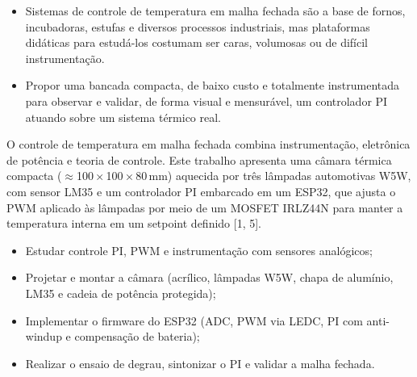
\begin{itemize}
  \item Sistemas de controle de temperatura em malha fechada são a base de fornos,
        incubadoras, estufas e diversos processos industriais, mas plataformas didáticas
        para estudá-los costumam ser caras, volumosas ou de difícil instrumentação.
  \item Propor uma bancada compacta, de baixo custo e totalmente instrumentada para observar
        e validar, de forma visual e mensurável, um controlador PI atuando sobre um sistema
        térmico real.
\end{itemize}


O controle de temperatura em malha fechada combina instrumentação, eletrônica de potência e
teoria de controle. Este trabalho apresenta uma câmara térmica compacta
(\(\approx\)100\,×\,100\,×\,80\,mm) aquecida por três lâmpadas automotivas W5W, com sensor
LM35 e um controlador PI embarcado em um ESP32, que ajusta o PWM aplicado às lâmpadas por meio
de um MOSFET IRLZ44N para manter a temperatura interna em um setpoint definido [1, 5].

\begin{itemize}
  \item Estudar controle PI, PWM e instrumentação com sensores analógicos;
  \item Projetar e montar a câmara (acrílico, lâmpadas W5W, chapa de alumínio, LM35 e cadeia
        de potência protegida);
  \item Implementar o firmware do ESP32 (ADC, PWM via LEDC, PI com anti-windup e compensação
        de bateria);
  \item Realizar o ensaio de degrau, sintonizar o PI e validar a malha fechada.
\end{itemize}
